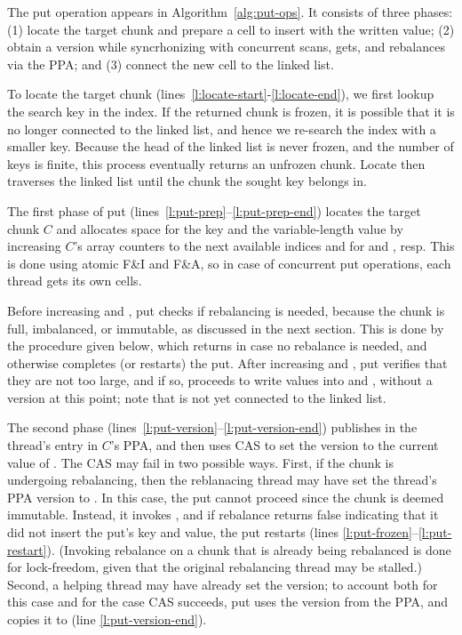 The put operation appears in Algorithm~\ref{alg:put-ops}. It
consists of three phases: (1) locate the target chunk and
prepare a cell to insert with the written value; (2) obtain a version while syncrhonizing with
concurrent scans, gets, and rebalances via the PPA; and (3) connect  the new cell to the linked list.


To locate the target chunk (lines~\ref{l:locate-start}-\ref{l:locate-end}), we first lookup the search key in the index. If the returned chunk is frozen, 
it is possible that it is no longer connected to the linked list, and hence we re-search the index with a smaller key. Because the head of the linked list is never frozen, 
and the number of keys is finite, this process eventually returns an unfrozen chunk. 
Locate then traverses the linked list until the chunk the sought key belongs in.

The first phase of put (lines~\ref{l:put-prep}--\ref{l:put-prep-end})
locates the target chunk $C$ and  allocates space for the key and the variable-length value 
by increasing $C$'s array  counters to the next available indices  and  for  and , resp.
This is done using atomic F\&I and F\&A, so in case of concurrent put operations, each thread gets its own cells.

Before increasing  and , put checks if rebalancing is needed, because the chunk is full, imbalanced, or immutable, 
as discussed in the next section. This is done by the procedure  given below, 
which returns  in case no rebalance is needed, and otherwise completes (or restarts) the put.
After increasing  and , put verifies that they are not too large, 
and if so, proceeds to write values into  and , without a version at this point; note that  is not yet connected to the linked list.

The second phase (lines~\ref{l:put-version}--\ref{l:put-version-end}) publishes  in the thread's entry in $C$'s PPA,
and then uses CAS to set the version to the current value of .
The CAS may fail in two possible ways. First, if the chunk is undergoing rebalancing, then
the reblanacing thread may have set the thread's PPA version to .
In this case, the put cannot proceed since the chunk is deemed immutable. Instead, it invokes , 
and if rebalance returns false indicating that it did not insert the put's key and value, the put restarts
(lines \ref{l:put-frozen}--\ref{l:put-restart}).
(Invoking rebalance on a chunk that is already being rebalanced is done for lock-freedom, given that the original rebalancing thread
may be stalled.)
Second, a helping thread may have already set the version;
to account both for this case and for the case CAS succeeds,
put uses the version from the PPA, and copies it to  (line \ref{l:put-version-end}).

